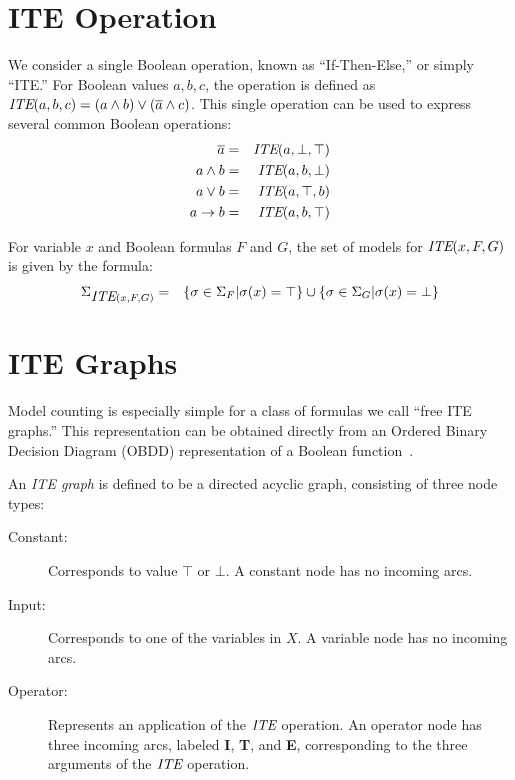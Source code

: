 \documentclass{llncs}
\newcommand{\tautology}{\top}
\newcommand{\nil}{\bot}
\newcommand{\obar}[1]{\overline{#1}}
\newcommand{\ite}{\mbox{\it ITE}}
\newcommand{\interp}{\sigma}
\newcommand{\interpset}[1]{\Sigma_{#1}}
\newcommand{\ifarg}{\textbf{I}}
\newcommand{\thenarg}{\textbf{T}}
\newcommand{\elsearg}{\textbf{E}}
\begin{document}
\section{ITE Operation}

We consider a single Boolean operation, known as
``If-Then-Else,'' or simply ``ITE.''  For Boolean values $a, b, c$,
the operation is defined as $\ite(a,b,c) = (a \land b) \lor (\obar{a}
\land c)$.  This single operation can be used to express several common Boolean operations:
\begin{eqnarray*}
\obar{a} & = & \ite(a, \nil, \tautology) \\
a \land b & = & \ite(a, b, \nil) \\
a \lor b & = & \ite(a, \tautology, b) \\
a \rightarrow b & = & \ite(a, b, \tautology) \\
\end{eqnarray*}  

For variable $x$ and Boolean formulas $F$ and $G$, the set of models
for $\ite(x, F, G)$ is given by the formula:
\begin{eqnarray}
  \interpset{\ite(x, F, G)} & = & \{ \interp \in \interpset{F} | \interp(x) = \tautology \}
  \cup \{ \interp \in \interpset{G} | \interp(x) = \nil \} \label{eqn:ite:interp}
\end{eqnarray}

\section{ITE Graphs}
Model counting is especially simple for a class of formulas we
call ``free ITE graphs.''  This representation can be obtained
directly from an Ordered Binary Decision Diagram (OBDD) representation
of a Boolean function~\cite{Bryant:1986}.

An {\em ITE graph} is defined to be a directed acyclic graph,
consisting of three node types:
\begin{description}
\item[Constant:] Corresponds to value $\tautology$ or $\nil$.  A constant node has no incoming arcs.
\item[Input:] Corresponds to one of the variables in $X$.   A variable node has no incoming arcs.
\item[Operator:] Represents an application of the $\ite$ operation.  An operator node has three incoming arcs, labeled \ifarg{}, \thenarg{}, and \elsearg{}, corresponding to the three arguments of the $\ite$ operation.
\end{description}  
\end{document}
